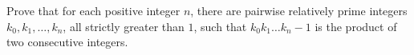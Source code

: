 Prove that for each positive integer $ n$, there are pairwise relatively prime integers $k_0,k_1,\ldots,k_n$, all strictly greater than $1$, such that $k_0k_1\ldots k_n-1$ is the product of two consecutive integers.